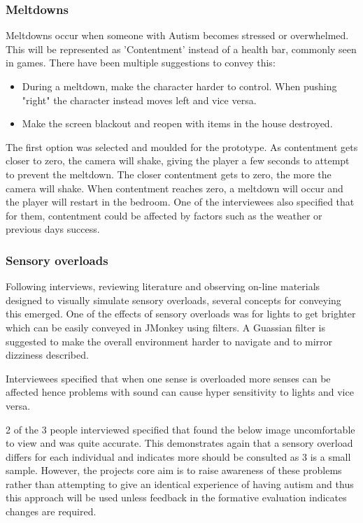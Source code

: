 \documentclass[11pt]{report}
\begin{document}
\subsubsection{Meltdowns}
Meltdowns occur when someone with Autism becomes stressed or overwhelmed. This will be represented as 'Contentment' instead of a health bar, commonly seen in games. There have been multiple suggestions to convey this:

\begin{itemize}
\item During a meltdown, make the character harder to control. When pushing "right" the character instead moves left and vice versa.
\item Make the screen blackout and reopen with items in the house destroyed.
\end{itemize}

The first option was selected and moulded for the prototype. As contentment gets closer to zero, the camera will shake, giving the player a few seconds to attempt to prevent the meltdown. The closer contentment gets to zero, the more the camera will shake. When contentment reaches zero, a meltdown will occur and the player will restart in the bedroom. One of the interviewees also specified that for them, contentment could be affected by factors such as the weather or previous days success. 

\subsubsection{Sensory overloads}
Following interviews, reviewing literature and observing on-line materials designed to visually simulate sensory overloads, several concepts for conveying this emerged. One of the effects of sensory overloads was for lights to get brighter which can be easily conveyed in JMonkey using filters. A Guassian filter is suggested to make the overall environment harder to navigate and to mirror dizziness described. 

Interviewees specified that when one sense is overloaded more senses can be affected hence problems with sound can cause hyper sensitivity to lights and vice versa.


2 of the 3 people interviewed specified that found the below image uncomfortable to view and was quite accurate. This demonstrates again that a sensory overload differs for each individual and indicates more should be consulted as 3 is a small sample. However, the projects core aim is to raise awareness of these problems rather than attempting to give an identical experience of having autism and thus this approach will be used unless feedback in the formative evaluation indicates changes are required. 
\end{document}
